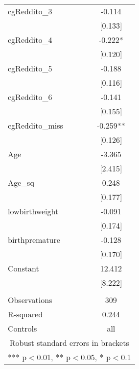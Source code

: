 \documentclass[]{article}
\begin{document}
\begin{tabular}{lc}
cgReddito\_3 & -0.114 \\
 & [0.133] \\
cgReddito\_4 & -0.222* \\
 & [0.120] \\
cgReddito\_5 & -0.188 \\
 & [0.116] \\
cgReddito\_6 & -0.141 \\
 & [0.155] \\
cgReddito\_miss & -0.259** \\
 & [0.126] \\
Age & -3.365 \\
 & [2.415] \\
Age\_sq & 0.248 \\
 & [0.177] \\
lowbirthweight & -0.091 \\
 & [0.174] \\
birthpremature & -0.128 \\
 & [0.170] \\
Constant & 12.412 \\
 & [8.222] \\
 &  \\
Observations & 309 \\
R-squared & 0.244 \\
 Controls & all \\ \hline
\multicolumn{2}{c}{ Robust standard errors in brackets} \\
\multicolumn{2}{c}{ *** p$<$0.01, ** p$<$0.05, * p$<$0.1} \\
\end{tabular}
\end{document}
